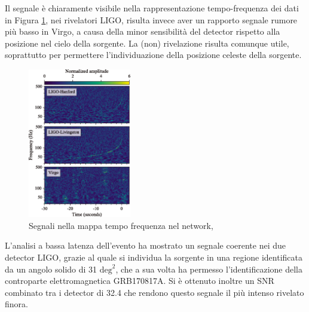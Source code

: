 Il segnale è chiaramente visibile nella rappresentazione tempo-frequenza dei dati in Figura  \ref{fig:osservazione_gw170817}, nei rivelatori LIGO, risulta invece aver un rapporto segnale rumore più basso in Virgo, a causa della minor sensibilità del detector rispetto alla posizione nel cielo della sorgente. La (non) rivelazione risulta comunque utile, soprattutto per permettere l'individuazione della posizione celeste della sorgente.

\begin{figure}
	\vspace{-25pt}
	\begin{center}
		\includegraphics[width=0.4\textwidth]{figures/Capitolo_2/gw170817_time_freq.png}
	\end{center}
	\vspace{-7pt}
	\caption{Segnali nella mappa tempo frequenza nel network, \cite{Abbott_2017a}}
	\label{fig:osservazione_gw170817}
	\vspace{-25pt}
\end{figure}
L'analisi a bassa latenza dell'evento ha mostrato un segnale coerente nei due detector LIGO, grazie al quale si individua la sorgente in una regione identificata da un angolo solido di 31 $\text{deg}^2$, che a sua volta ha permesso l'identificazione della controparte elettromagnetica GRB170817A. 
Si è ottenuto inoltre un SNR combinato tra i detector di 32.4 che rendono questo segnale il più intenso rivelato finora\cite{Abbott_2017a}.

